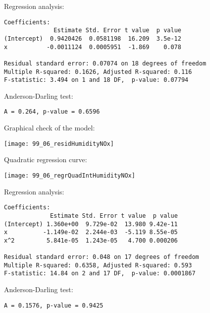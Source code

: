 \begin{frame}[fragile]
  Regression analysis:\\
  \begin{small}
    \begin{verbatim}
Coefficients:
              Estimate Std. Error t value  p value   
(Intercept)  0.9420426  0.0581198  16.209  3.5e-12
x           -0.0011124  0.0005951  -1.869    0.078

Residual standard error: 0.07074 on 18 degrees of freedom
Multiple R-squared: 0.1626,	Adjusted R-squared: 0.116 
F-statistic: 3.494 on 1 and 18 DF,  p-value: 0.07794 
    \end{verbatim}
  \end{small}
  Anderson-Darling test:\\
  \begin{small}
    \begin{verbatim}
A = 0.264, p-value = 0.6596
    \end{verbatim}
  \end{small}
\end{frame}

\begin{frame}
  Graphical check of the model:\\
  \vspace{.3cm}
  \begin{center}
    \texttt{[image: 99\_06\_residHumidityNOx]}
  \end{center}
\end{frame}

\begin{frame}
  Quadratic regression curve:\\
  \vspace{.3cm}
  \begin{center}
    \texttt{[image: 99\_06\_regrQuadIntHumidityNOx]}
  \end{center}
\end{frame}

\begin{frame}[fragile]
  Regression analysis:\\
  \begin{small}
    \begin{verbatim}
Coefficients:
             Estimate Std. Error t value  p value   
(Intercept) 1.360e+00  9.729e-02  13.980 9.42e-11
x          -1.149e-02  2.244e-03  -5.119 8.55e-05
x^2         5.841e-05  1.243e-05   4.700 0.000206

Residual standard error: 0.048 on 17 degrees of freedom
Multiple R-squared: 0.6358,	Adjusted R-squared: 0.593 
F-statistic: 14.84 on 2 and 17 DF,  p-value: 0.0001867 
    \end{verbatim}
  \end{small}
  Anderson-Darling test:\\
  \begin{small}
    \begin{verbatim}
A = 0.1576, p-value = 0.9425
    \end{verbatim}
  \end{small}
\end{frame}

